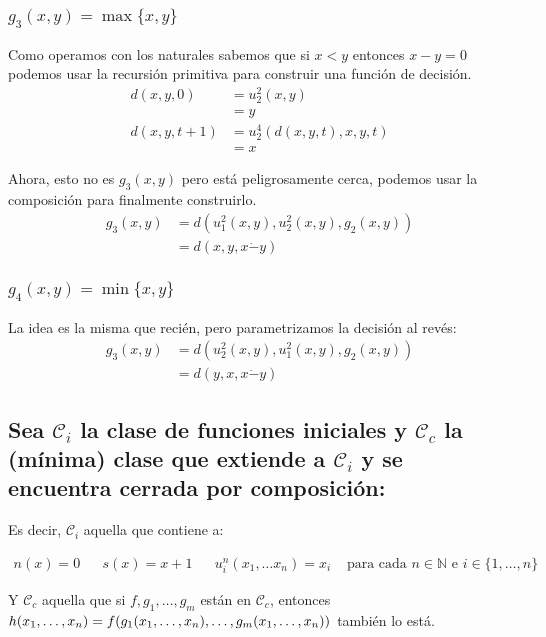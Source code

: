 \documentclass[fleqn, 11pt]{article}
\newcommand{\nat}{\mathbb{N}}
\newcommand{\Ccur}{\mathcal{C}}
\begin{document}
\subsubsection{$g_3(x, y) = \max\{x, y\}$}

Como operamos con los naturales sabemos que si $x < y$ entonces $x - y = 0$
podemos usar la recursión primitiva para construir una función de decisión.
\begin{align*}
	d(x, y, 0)     &= u^2_2(x, y) \\
	&= y \\
	d(x, y, t + 1) &= u^4_2(d(x, y, t), x, y, t) \\
	&= x
\end{align*}

Ahora, esto no es $g_3(x, y)$ pero está peligrosamente cerca, podemos usar la
composición para finalmente construirlo.
\[
	\begin{split}
		g_3(x, y) &= d(u^2_1(x, y), u^2_2(x, y), g_2(x, y)) \\
		&= d(x, y, x \dot- y)
	\end{split}
\]

\subsubsection{$g_4(x, y) = \min\{x, y\}$}

La idea es la misma que recién, pero parametrizamos la decisión al revés:
\[
	\begin{split}
		g_3(x, y) &= d(u^2_2(x, y), u^2_1(x, y), g_2(x, y)) \\
		&= d(y, x, x \dot- y)
	\end{split}
\]

\subsection{Sea $\Ccur_i$ la clase de funciones iniciales y $\Ccur_c$ la
(mínima) clase que extiende a $\Ccur_i$ y se encuentra cerrada por
composición:}

Es decir, $\Ccur_i$ aquella que contiene a:

\begin{align*}
	n(x) = 0
	&&s(x) = x + 1
	&&u^n_i(x_1, \dots x_n)=x_i
	& \text{\ para cada } n \in \nat \text{\ e } i \in \{1, \dots, n\}
\end{align*}

Y $\Ccur_c$ aquella que si $f, g_1, \dots, g_m$ están en $\Ccur_c$, entonces
$h(x_1, \dots, x_n) =\\ f(g_1(x_1, \dots, x_n), \dots, g_m(x_1, \dots, x_n))$
también lo está.
\end{document}

